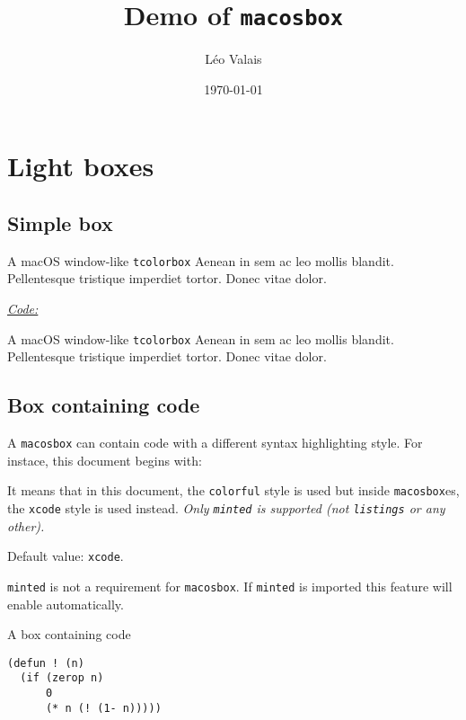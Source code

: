 \documentclass[a4paper]{article}
\title{Demo of \texttt{macosbox}}
\author{Léo Valais}
\date\today
\newcommand{\code}[1][Code]{\medskip\underline{\textit{\large{}#1:}}}
\begin{document}
\maketitle

\section{Light boxes}
\subsection{Simple box}
\begin{macosbox}{A macOS window-like \texttt{tcolorbox}}
  Aenean in sem ac leo mollis blandit.
  Pellentesque tristique imperdiet tortor.
  Donec vitae dolor.
\end{macosbox}

\code
\begin{latexcode}
\begin{macosbox}{A macOS window-like \texttt{tcolorbox}}
  Aenean in sem ac leo mollis blandit.
  Pellentesque tristique imperdiet tortor.
  Donec vitae dolor.
\end{macosbox}
\end{latexcode}

\subsection{Box containing code}
A \texttt{macosbox} can contain code with a different syntax highlighting style. For
instace, this document begins with:
\begin{latexcode}
\end{latexcode}
It means that in this document, the \texttt{colorful} style is used but inside \texttt{macosbox}es,
the \texttt{xcode} style is used instead. \textit{Only \texttt{minted} is supported (not \texttt{listings} or any other).}

Default value: \texttt{xcode}.

\texttt{minted} is not a requirement for \texttt{macosbox}. If \texttt{minted} is
imported this feature will enable automatically.

\begin{macosbox}{A box containing code}
\begin{verbatim}
(defun ! (n)
  (if (zerop n)
      0
      (* n (! (1- n)))))
\end{verbatim}
\end{macosbox}
\end{document}

